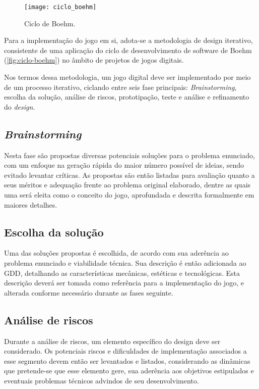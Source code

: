 \begin{figure}[!htb]
	\centering
	\caption{Ciclo de Boehm.}
	\texttt{[image: ciclo\_boehm]}
	\label{fig:ciclo-boehm}
\end{figure}

Para a implementação do jogo em si, adota-se a metodologia de design iterativo,
consistente de uma aplicação do ciclo de desenvolvimento de software de 
Boehm (\autoref{fig:ciclo-boehm}) no âmbito de projetos de jogos digitais.

Nos termos dessa metodologia, um jogo digital deve ser implementado por meio de 
um processo iterativo, ciclando entre seis fase principais: \textit{Brainstorming}, 
escolha da solução, análise de riscos, prototipação, teste e análise e 
refinamento do \textit{design}.

\subsection{\textit{Brainstorming}}\label{subsec-met-brainstorming}

Nesta fase são propostas diversas potenciais soluções para o problema enunciado, 
com um enfoque na geração rápida do maior número possível de ideias, sendo 
evitado levantar críticas. As propostas são então listadas para avaliação quanto 
a seus méritos e adequação frente ao problema original elaborado, dentre as 
quais uma será eleita como o conceito do jogo, aprofundada e descrita formalmente 
em maiores detalhes.

\subsection{Escolha da solução}\label{subsec-met-escolha-solucao}

Uma das soluções propostas é escolhida, de acordo com sua aderência ao 
problema enunciado e viabilidade técnica. Sua descrição é então adicionada ao 
GDD, detalhando as características mecânicas, estéticas e tecnológicas. 
Esta descrição deverá ser tomada como referência para a implementação do jogo, 
e alterada conforme necessário durante as fases seguinte.

\subsection{Análise de riscos}\label{subsec-met-analise-riscos}

Durante a análise de riscos, um elemento específico do design deve ser 
considerado. Os potenciais riscos e dificuldades de implementação associados 
a esse segmento devem então ser levantados e listados, considerando as dinâmicas 
que pretende-se que esse elemento gere, sua aderência aos objetivos estipulados 
e eventuais problemas técnicos advindos de seu desenvolvimento.

